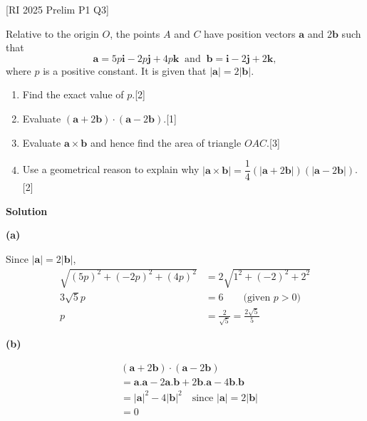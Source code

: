 \documentclass[a4paper,11pt,oneside]{book}
\newcounter{wq}[section]
\newcommand{\Q}[1]{\par\needspace{5\baselineskip}\medskip\stepcounter{wq}\noindent\textbf{\thewq}\quad #1\par}
\begin{document}
\Q{\textcolor{black!60}{\small[RI 2025 Prelim P1 Q3]}\par\smallskip Relative to the origin $O$, the points $A$ and $C$ have position vectors $\mathbf a$ and $2\mathbf b$ such that \[\mathbf a=5p\mathbf i-2p\mathbf j+4p\mathbf k\ \text{ and }\ \mathbf b=\mathbf i-2\mathbf j+2\mathbf k,\] where $p$ is a positive constant. It is given that $|\mathbf a|=2|\mathbf b|$.\begin{enumerate}[label=\textbf{(\alph*)},leftmargin=2.2em,itemsep=3pt]\item Find the exact value of $p$.\hfill[2]\item Evaluate $(\mathbf a+2\mathbf b)\cdot(\mathbf a-2\mathbf b)$.\hfill[1]\item Evaluate $\mathbf a\times\mathbf b$ and hence find the area of triangle $OAC$.\hfill[3]\item Use a geometrical reason to explain why $|\mathbf a\times\mathbf b|=\dfrac14\left(|\mathbf a+2\mathbf b|\right)\left(|\mathbf a-2\mathbf b|\right)$.\hfill[2]\end{enumerate}}
\par\smallskip\noindent\textbf{Solution}\par \par\smallskip\noindent\textbf{(a)}\par\nopagebreak{}Since $|\mathbf a|=2|\mathbf b|$,\begin{align*}\sqrt{(5p)^2+(-2p)^2+(4p)^2}&=2\sqrt{1^2+(-2)^2+2^2}\\ 3\sqrt5p&=6\qquad\text{(given }p>0)\\ p&=\frac{2}{\sqrt5}=\frac{2\sqrt5}{5}\end{align*}
\par\smallskip\noindent\textbf{(b)}\par\nopagebreak{}\begin{align*}&(\mathbf a+2\mathbf b)\cdot(\mathbf a-2\mathbf b)\\ &=\mathbf a.\mathbf a-2\mathbf a.\mathbf b+2\mathbf b.\mathbf a-4\mathbf b.\mathbf b\\ &=|\mathbf a|^2-4|\mathbf b|^2\quad\text{since }|\mathbf a|=2|\mathbf b|\\ &=0\end{align*}
\end{document}
